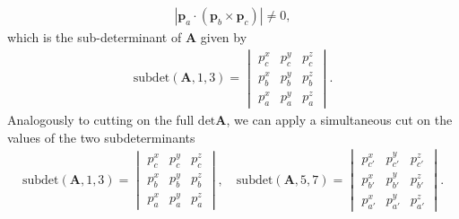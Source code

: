 \documentclass[twoside,english]{uiofysmaster}
\begin{document}
\begin{align}
	\left| \mathbf p_a \cdot \left( \mathbf p_b \times \mathbf p_c \right) \right| \neq 0,
\end{align}
which is the sub-determinant of $\mathbf{A}$ given by
\begin{align}
	\mathrm{subdet}(\mathbf{A}, 1,3) = \begin{vmatrix}p_c^x & p_c^y & p_c^z\\
	p_b^x & p_b^y & p_b^z\\
	p_a^x & p_a^y & p_a^z\end{vmatrix}.
\end{align}
Analogously to cutting on the full $\mathrm{det}\mathbf{A}$, we can apply a simultaneous cut on the values of the two subdeterminants
\begin{align}
	\mathrm{subdet}(\mathbf{A}, 1,3) = 
	\begin{vmatrix}p_c^x & p_c^y & p_c^z\\
	p_b^x & p_b^y & p_b^z\\
	p_a^x & p_a^y & p_a^z\end{vmatrix}, \quad 
	\mathrm{subdet}(\mathbf{A}, 5,7) = 
	\begin{vmatrix}	p_{c'}^x & p_{c'}^y & p_{c'}^z\\
					p_{b'}^x & p_{b'}^y & p_{b'}^z\\
					p_{a'}^x & p_{a'}^y & p_{a'}^z\end{vmatrix}.
\end{align}
\end{document}

